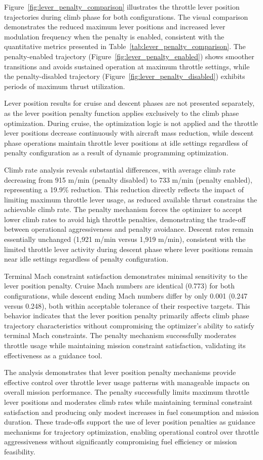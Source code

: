 Figure~\ref{fig:lever_penalty_comparison} illustrates the throttle lever position trajectories during climb phase for both configurations. The visual comparison demonstrates the reduced maximum lever positions and increased lever modulation frequency when the penalty is enabled, consistent with the quantitative metrics presented in Table~\ref{tab:lever_penalty_comparison}. The penalty-enabled trajectory (Figure~\ref{fig:lever_penalty_enabled}) shows smoother transitions and avoids sustained operation at maximum throttle settings, while the penalty-disabled trajectory (Figure~\ref{fig:lever_penalty_disabled}) exhibits periods of maximum thrust utilization. 

Lever position results for cruise and descent phases are not presented separately, as the lever position penalty function applies exclusively to the climb phase optimization. During cruise, the optimization logic is not applied and the throttle lever positions decrease continuously with aircraft mass reduction, while descent phase operations maintain throttle lever positions at idle settings regardless of penalty configuration as a result of dynamic programming optimization.


Climb rate analysis reveals substantial differences, with average climb rate decreasing from 915 m/min (penalty disabled) to 733 m/min (penalty enabled), representing a 19.9\% reduction. This reduction directly reflects the impact of limiting maximum throttle lever usage, as reduced available thrust constrains the achievable climb rate. The penalty mechanism forces the optimizer to accept lower climb rates to avoid high throttle penalties, demonstrating the trade-off between operational aggressiveness and penalty avoidance. Descent rates remain essentially unchanged (1,921 m/min versus 1,919 m/min), consistent with the limited throttle lever activity during descent phase where lever positions remain near idle settings regardless of penalty configuration.

Terminal Mach constraint satisfaction demonstrates minimal sensitivity to the lever position penalty. Cruise Mach numbers are identical (0.773) for both configurations, while descent ending Mach numbers differ by only 0.001 (0.247 versus 0.248), both within acceptable tolerance of their respective targets. This behavior indicates that the lever position penalty primarily affects climb phase trajectory characteristics without compromising the optimizer's ability to satisfy terminal Mach constraints. The penalty mechanism successfully moderates throttle usage while maintaining mission constraint satisfaction, validating its effectiveness as a guidance tool.


The analysis demonstrates that lever position penalty mechanisms provide effective control over throttle lever usage patterns with manageable impacts on overall mission performance. The penalty successfully limits maximum throttle lever positions and moderates climb rates while maintaining terminal constraint satisfaction and producing only modest increases in fuel consumption and mission duration. These trade-offs support the use of lever position penalties as guidance mechanisms for trajectory optimization, enabling operational control over throttle aggressiveness without significantly compromising fuel efficiency or mission feasibility.
